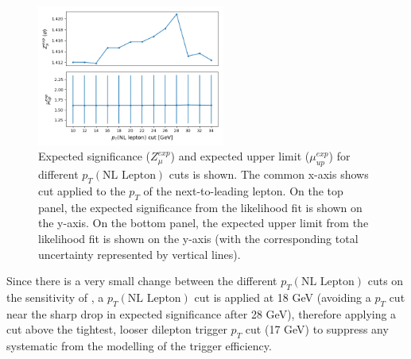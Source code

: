 \begin{figure}[h!]
	\includegraphics[width = 0.55\textwidth]{figures/NL_Lep_optimization.png}
  \centering
	\caption{Expected significance ($Z_{\mu}^{exp}$) and expected upper limit ($\mu_{up}^{exp}$) for different $p_{T}(\text{NL Lepton})$ cuts is shown. The common x-axis shows cut applied to the $p_{T}$ of the next-to-leading lepton. On the top panel, the expected significance from the likelihood fit is shown on the y-axis. On the bottom panel, the expected upper limit from the likelihood fit is shown on the y-axis (with the corresponding total uncertainty represented by vertical lines).}
	\label{fig:4lep-NLlep-optimization}
\end{figure}Since there is a very small change between the different $p_{T}(\text{NL Lepton})$ cuts on the sensitivity of \tWZ, a $p_{T}(\text{NL Lepton})$ cut is applied at 18 GeV (avoiding a $p_{T}$ cut near the sharp drop in expected significance after 28 GeV), therefore applying a cut above the tightest, looser dilepton trigger $p_{T}$ cut (17 GeV) to suppress any systematic from the modelling of the trigger efficiency.

